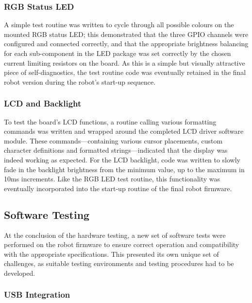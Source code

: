 \FloatBarrier
\subsubsection{RGB Status LED}

A simple test routine was written to cycle through all possible colours on the mounted RGB status LED; this demonstrated that the three GPIO channels were configured and connected correctly, and that the appropriate brightness balancing for each sub-component in the LED package was set correctly by the chosen current limiting resistors on the board. As this is a simple but visually attractive piece of self-diagnostics, the test routine code was eventually retained in the final robot version during the robot's start-up sequence.

\FloatBarrier
\subsubsection{LCD and Backlight}

To test the board's LCD functions, a routine calling various formatting commands was written and wrapped around the completed LCD driver software module. These commands---containing various cursor placements, custom character definitions and formatted strings---indicated that the display was indeed working as expected. For the LCD backlight, code was written to slowly fade in the backlight brightness from the minimum value, up to the maximum in 10ms increments. Like the RGB LED test routine, this functionality was eventually incorporated into the start-up routine of the final robot firmware.

\FloatBarrier
\subsection{Software Testing}

At the conclusion of the hardware testing, a new set of software tests were performed on the robot firmware to ensure correct operation and compatibility with the appropriate specifications. This presented its own unique set of challenges, as suitable testing environments and testing procedures had to be developed.

\FloatBarrier
\subsubsection{USB Integration}

